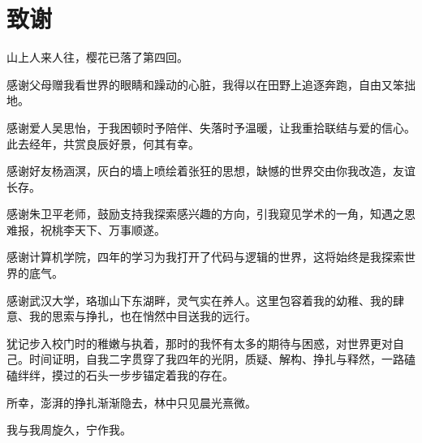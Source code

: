 
\clearpage
{}
{}

\chapter*{致谢}

山上人来人往，樱花已落了第四回。

感谢父母赠我看世界的眼睛和躁动的心脏，我得以在田野上追逐奔跑，自由又笨拙地。

感谢爱人吴思怡，于我困顿时予陪伴、失落时予温暖，让我重拾联结与爱的信心。此去经年，共赏良辰好景，何其有幸。

感谢好友杨涵溟，灰白的墙上喷绘着张狂的思想，缺憾的世界交由你我改造，友谊长存。

感谢朱卫平老师，鼓励支持我探索感兴趣的方向，引我窥见学术的一角，知遇之恩难报，祝桃李天下、万事顺遂。

感谢计算机学院，四年的学习为我打开了代码与逻辑的世界，这将始终是我探索世界的底气。

感谢武汉大学，珞珈山下东湖畔，灵气实在养人。这里包容着我的幼稚、我的肆意、我的思索与挣扎，也在悄然中目送我的远行。

犹记步入校门时的稚嫩与执着，那时的我怀有太多的期待与困惑，对世界更对自己。时间证明，自我二字贯穿了我四年的光阴，质疑、解构、挣扎与释然，一路磕磕绊绊，摸过的石头一步步锚定着我的存在。

所幸，澎湃的挣扎渐渐隐去，林中只见晨光熹微。

我与我周旋久，宁作我。
